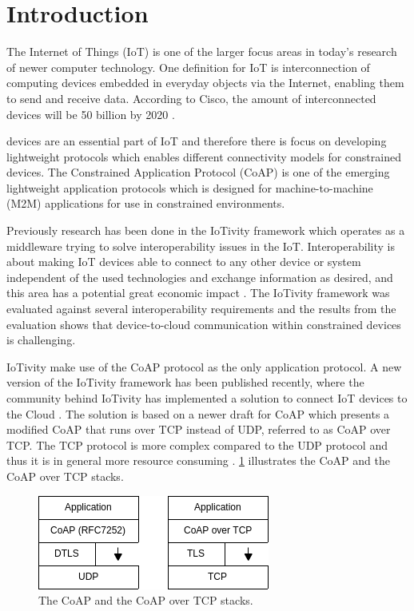\section{Introduction}{\label{sec:intro}}
The Internet of Things (IoT) is one of the larger focus areas in today's research of newer computer technology. One definition for IoT is interconnection of computing devices embedded in everyday objects via the Internet, enabling them to send and receive data. According to Cisco, the amount of interconnected devices will be 50 billion by 2020 \cite{ciscoiot:online} \cite{Inter74:online}.

 devices are an essential part of IoT and therefore there is focus on developing lightweight protocols which enables different connectivity models for constrained devices.  
The Constrained Application Protocol (CoAP) \cite{rfc7252} is one of the emerging lightweight application protocols which is designed for machine-to-machine (M2M) applications for use in constrained environments.   

Previously research has been done \cite{interoperabilityChallenge} in the IoTivity framework which operates as a middleware trying to solve interoperability issues in the IoT. Interoperability is about making IoT devices able to connect to any other device or system independent of the used technologies and exchange information as desired, and this area has a potential great economic impact \cite{Unloc34:online}. The IoTivity framework was evaluated against several interoperability requirements and the results from the evaluation shows that device-to-cloud communication within constrained devices is challenging.

IoTivity make use of the CoAP protocol as the only application protocol. 
A new version of the IoTivity framework has been published recently, where the community behind IoTivity has implemented a solution to connect IoT devices to the Cloud \cite{IoTiv3:online}. The solution is based on a newer draft for CoAP \cite{ietf-core-coap-tcp-tls-02} which presents a modified CoAP that runs over TCP instead of UDP, referred to as CoAP over TCP.
The TCP protocol is more complex compared to the UDP protocol and thus it is in general more resource consuming \cite{giannoulis2009tcp}. \figurename{\ref{fig:coapstack}} illustrates the CoAP and the CoAP over TCP stacks.
\begin{figure}[bht]
	\centering
	\includegraphics[width=3in]{gfx/coapstack}
	\caption{The CoAP and the CoAP over TCP stacks.}
	\label{fig:coapstack}
\end{figure}

